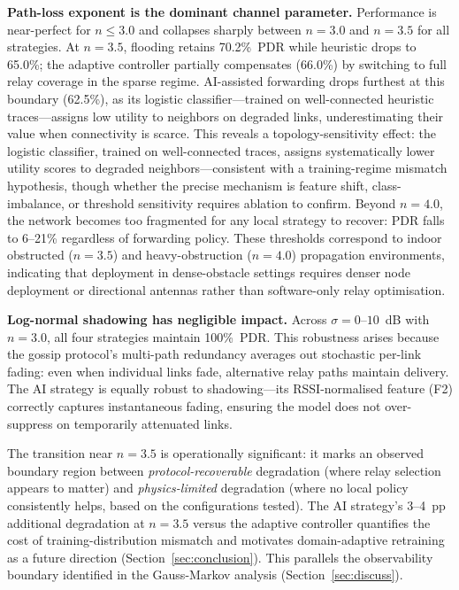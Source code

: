 \documentclass[conference]{IEEEtran}
\begin{document}
\textbf{Path-loss exponent is the dominant channel parameter.}  Performance
is near-perfect for $n \leq 3.0$ and collapses sharply between $n=3.0$ and
$n=3.5$ for all strategies.  At $n=3.5$, flooding retains 70.2\%~PDR while
heuristic drops to 65.0\%; the adaptive controller partially compensates (66.0\%)
by switching to full relay coverage in the sparse regime.  AI-assisted forwarding
drops furthest at this boundary (62.5\%), as its logistic classifier---trained on
well-connected heuristic traces---assigns low utility to neighbors on degraded
links, underestimating their value when connectivity is scarce.  This reveals a topology-sensitivity effect: the logistic classifier, trained on
well-connected traces, assigns systematically lower utility scores to degraded
neighbors---consistent with a training-regime mismatch hypothesis, though whether
the precise mechanism is feature shift, class-imbalance, or threshold sensitivity
requires ablation to confirm.
Beyond $n=4.0$, the network becomes too fragmented for any local strategy to
recover: PDR falls to 6--21\% regardless of forwarding policy.  These thresholds
correspond to indoor obstructed ($n=3.5$) and heavy-obstruction ($n=4.0$)
propagation environments, indicating that deployment in dense-obstacle settings
requires denser node deployment or directional antennas rather than software-only
relay optimisation.

\textbf{Log-normal shadowing has negligible impact.}  Across $\sigma =
0$--$10$~dB with $n=3.0$, all four strategies maintain 100\%~PDR.
This robustness arises because the gossip protocol's multi-path redundancy
averages out stochastic per-link fading: even when individual links fade,
alternative relay paths maintain delivery.  The AI strategy is equally robust
to shadowing---its RSSI-normalised feature (F2) correctly captures instantaneous
fading, ensuring the model does not over-suppress on temporarily attenuated links.

The transition near $n=3.5$ is operationally significant: it marks an observed
boundary region between \emph{protocol-recoverable} degradation (where relay
selection appears to matter) and \emph{physics-limited} degradation (where no
local policy consistently helps, based on the configurations tested).  The AI strategy's 3--4~pp additional degradation at $n=3.5$
versus the adaptive controller quantifies the cost of training-distribution
mismatch and motivates domain-adaptive retraining as a future direction
(Section~\ref{sec:conclusion}).  This parallels the observability boundary
identified in the Gauss-Markov analysis (Section~\ref{sec:discuss}).
\end{document}
